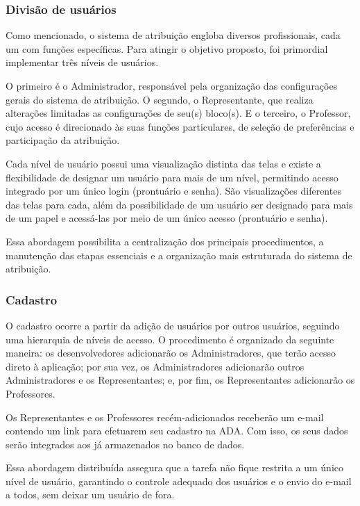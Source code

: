 \documentclass[12pt]{article}
\begin{document}
\subsubsection{Divisão de usuários}
\par Como mencionado, o sistema de atribuição engloba diversos profissionais, cada um com funções específicas. Para atingir o objetivo proposto, foi primordial implementar três níveis de usuários. 
\par O primeiro é o Administrador, responsável pela organização das configurações gerais do sistema de atribuição. O segundo, o Representante, que realiza alterações limitadas as configurações de seu(s) bloco(s). E o terceiro, o Professor, cujo acesso é direcionado às suas funções particulares, de seleção de preferências e participação da atribuição. 
\par Cada nível de usuário possui uma visualização distinta das telas e existe a flexibilidade de designar um usuário para mais de um nível, permitindo acesso integrado por um único login (prontuário e senha). São visualizações diferentes das telas para cada, além da possibilidade de um usuário ser designado para mais de um papel e acessá-las por meio de um único acesso (prontuário e senha).
\par Essa abordagem possibilita a centralização dos principais procedimentos, a manutenção das etapas essenciais e a organização mais estruturada do sistema de atribuição.
\subsubsection{Cadastro}
\par O cadastro ocorre a partir da adição de usuários por outros usuários, seguindo uma hierarquia de níveis de acesso. O procedimento é organizado da seguinte maneira: os desenvolvedores adicionarão os Administradores, que terão acesso direto à aplicação; por sua vez, os Administradores adicionarão outros Administradores e os Representantes; e, por fim, os Representantes adicionarão os Professores.
\par Os Representantes e os Professores recém-adicionados receberão um e-mail contendo um link para efetuarem seu cadastro na ADA. Com isso, os seus dados serão integrados aos já armazenados no banco de dados.
\par Essa abordagem distribuída assegura que a tarefa não fique restrita a um único nível de usuário, garantindo o controle adequado dos usuários e o envio do e-mail a todos, sem deixar um usuário de fora.
\end{document}
